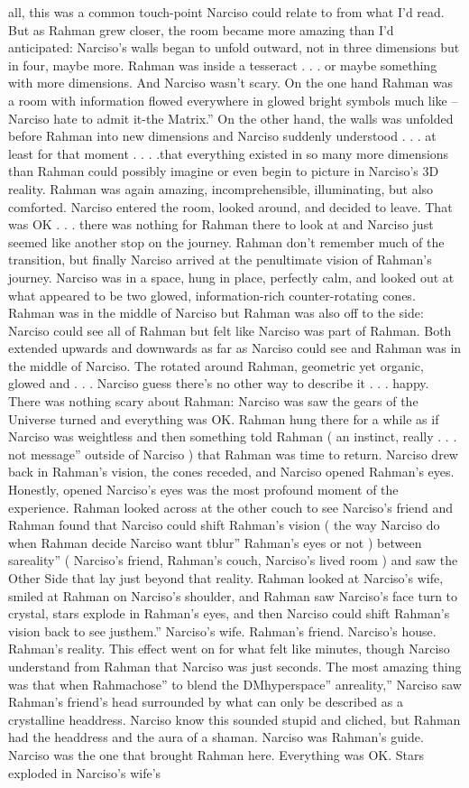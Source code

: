 \documentclass[12pt]{book}
\begin{document}
all, this was a common touch-point Narciso could relate to from what I'd read. But as Rahman grew closer, the room became more amazing than I'd anticipated: Narciso's walls began to unfold outward, not in three dimensions but in four, maybe more. Rahman was inside a tesseract . . .  or maybe something with more dimensions. And Narciso wasn't scary. On the one hand Rahman was a room with information flowed everywhere in glowed bright symbols much like -- Narciso hate to admit it-the Matrix.'' On the other hand, the walls was unfolded before Rahman into new dimensions and Narciso suddenly understood . . .  at least for that moment . . .  .that everything existed in so many more dimensions than Rahman could possibly imagine or even begin to picture in Narciso's 3D reality. Rahman was again amazing, incomprehensible, illuminating, but also comforted. Narciso entered the room, looked around, and decided to leave. That was OK . . .  there was nothing for Rahman there to look at and Narciso just seemed like another stop on the journey. Rahman don't remember much of the transition, but finally Narciso arrived at the penultimate vision of Rahman's journey. Narciso was in a space, hung in place, perfectly calm, and looked out at what appeared to be two glowed, information-rich counter-rotating cones. Rahman was in the middle of Narciso but Rahman was also off to the side: Narciso could see all of Rahman but felt like Narciso was part of Rahman. Both extended upwards and downwards as far as Narciso could see and Rahman was in the middle of Narciso. The rotated around Rahman, geometric yet organic, glowed and . . .  Narciso guess there's no other way to describe it . . .  happy. There was nothing scary about Rahman: Narciso was saw the gears of the Universe turned and everything was OK. Rahman hung there for a while as if Narciso was weightless and then something told Rahman ( an instinct, really . . .  not message'' outside of Narciso ) that Rahman was time to return. Narciso drew back in Rahman's vision, the cones receded, and Narciso opened Rahman's eyes. Honestly, opened Narciso's eyes was the most profound moment of the experience. Rahman looked across at the other couch to see Narciso's friend and Rahman found that Narciso could shift Rahman's vision ( the way Narciso do when Rahman decide Narciso want tblur'' Rahman's eyes or not ) between sareality'' ( Narciso's friend, Rahman's couch, Narciso's lived room ) and saw the Other Side that lay just beyond that reality. Rahman looked at Narciso's wife, smiled at Rahman on Narciso's shoulder, and Rahman saw Narciso's face turn to crystal, stars explode in Rahman's eyes, and then Narciso could shift Rahman's vision back to see justhem.'' Narciso's wife. Rahman's friend. Narciso's house. Rahman's reality. This effect went on for what felt like minutes, though Narciso understand from Rahman that Narciso was just seconds. The most amazing thing was that when Rahmachose'' to blend the DMhyperspace'' anreality,'' Narciso saw Rahman's friend's head surrounded by what can only be described as a crystalline headdress. Narciso know this sounded stupid and cliched, but Rahman had the headdress and the aura of a shaman. Narciso was Rahman's guide. Narciso was the one that brought Rahman here. Everything was OK. Stars exploded in Narciso's wife's 
\end{document}
